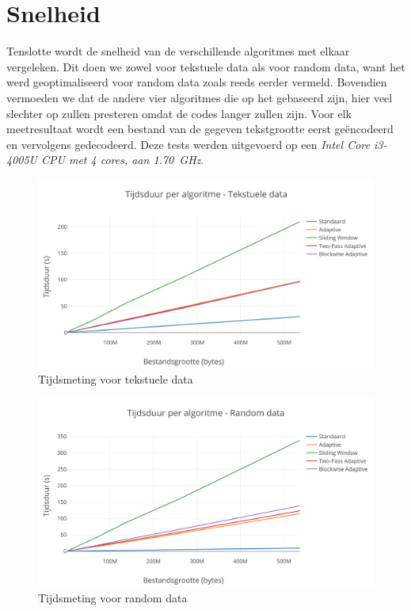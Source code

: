 \section{Snelheid}
Tenslotte wordt de snelheid van de verschillende algoritmes met elkaar vergeleken. Dit doen we zowel voor tekstuele data als voor random data, want het \huffstd werd geoptimaliseerd voor random data zoals reeds eerder vermeld. Bovendien vermoeden we dat de andere vier algoritmes die op het \huffadap gebaseerd zijn, hier veel slechter op zullen presteren omdat de codes langer zullen zijn. Voor elk meetresultaat wordt een bestand van de gegeven tekstgrootte eerst ge\"encodeerd en vervolgens gedecodeerd. Deze tests werden uitgevoerd op een \emph{Intel Core i3-4005U CPU met 4 cores, aan \SI{1.70}{\giga\hertz}}.
\begin{figure}[h]
	\centering
	\includegraphics[width=\linewidth]{resources/timing-regular.png}
	\caption{Tijdsmeting voor tekstuele data}
\end{figure}
\begin{figure}[h]
	\centering
	\includegraphics[width=\linewidth]{resources/timing-random.png}
	\caption{Tijdsmeting voor random data}
\end{figure}
